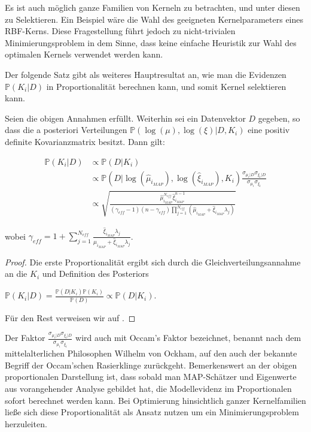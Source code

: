 Es ist auch möglich ganze Familien von Kerneln zu betrachten, und unter diesen zu Selektieren. Ein Beispiel wäre die Wahl des geeigneten Kernelparameters eines RBF-Kerns. Diese Fragestellung führt jedoch zu nicht-trivialen Minimierungsproblem in dem Sinne, dass keine einfache Heuristik zur Wahl des optimalen Kernels verwendet werden kann.

Der folgende Satz gibt als weiteres Hauptresultat an, wie man die Evidenzen $\mathbb{P}(K_i \vert D)$ in Proportionalität berechnen kann, und somit Kernel selektieren kann.


\begin{theorem}
Seien die obigen Annahmen erfüllt. Weiterhin sei ein Datenvektor $D$ gegeben, so dass die a posteriori Verteilungen $\mathbb{P}(\log(\mu),\log(\xi) \vert D, K_i)$ eine positiv definite Kovarianzmatrix besitzt. Dann gilt:

\begin{align*}
	\mathbb{P}(K_i \vert D) 
	&\propto \mathbb{P}(D \vert K_i)\\
 	&\propto \mathbb{P}(D \vert \log(\hat{\mu}_{i_{MAP}}), \log(\hat{\xi}_{i_{MAP}}), 			K_i)\frac{\sigma_{\mu_i\vert D} \sigma_{\xi_i\vert D}}{\sigma_{\mu_i} 						\sigma_{\xi_i}}\\
	&\propto \sqrt{\frac{\hat{\mu}^{N_{eff}}_{i_{MAP}} \hat{\xi}^{n-1}_{i_{MAP}}}				{(\gamma_{eff}-1)(n - \gamma_{eff}) \prod_{j=1}^{N_{eff}}(\hat{\mu}_{i_{MAP}} + 			\hat{\xi}_{i_{MAP}}\lambda_j)}}
\end{align*}

wobei $\gamma_{eff} = 1 + \sum_{j=1}^{N_{eff}}\frac{\hat{\xi}_{i_{MAP}}\lambda_j}{\hat{\mu}_{i_{MAP}} + \hat{\xi}_{i_{MAP}}\lambda_j}$.

\end{theorem}

\begin{proof}
Die erste Proportionalität ergibt sich durch die Gleichverteilungsannahme an die $K_i$ und Definition des Posteriors

\begin{center}
	$\mathbb{P}(K_i \vert D) = \frac{\mathbb{P}(D\vert K_i)\mathbb{P}(K_i)}{\mathbb{P}			(D)}
	\propto \mathbb{P}(D \vert K_i)$.
\end{center}
Für den Rest verweisen wir auf \cite{LS-SVM}.
\end{proof}

Der Faktor $\frac{\sigma_{\mu_i\vert D} \sigma_{\xi_i\vert D}}{\sigma_{\mu_i} 						\sigma_{\xi_i}}$ wird auch mit Occam's Faktor bezeichnet, benannt nach dem mittelalterlichen Philosophen Wilhelm von Ockham, auf den auch der bekannte Begriff der Occam'schen Rasierklinge zurückgeht. Bemerkenswert an der obigen proportionalen Darstellung ist, dass sobald man MAP-Schätzer und Eigenwerte aus vorangehender Analyse gebildet hat, die Modellevidenz im Proportionalen sofort berechnet werden kann. Bei Optimierung hinsichtlich ganzer Kernelfamilien ließe sich diese Proportionalität als Ansatz nutzen um ein Minimierungsproblem herzuleiten.

